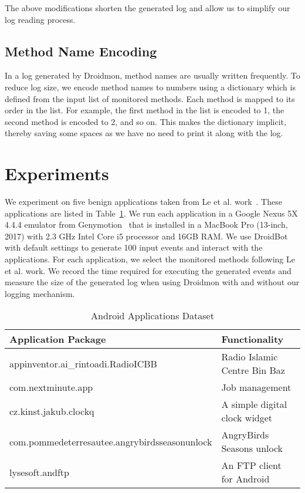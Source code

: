 \documentclass[12pt]{article}
\begin{document}
The above modifications shorten the generated log and allow us to simplify our log reading process. 

\subsection{Method Name Encoding}
In a log generated by Droidmon, method names are usually written frequently. To reduce log size, we encode method names to numbers using a dictionary which is defined from the input list of monitored methods. Each method is mapped to its order in the list. For example, the first method in the list is encoded to 1, the second method is encoded to 2, and so on. This makes the dictionary implicit, thereby saving some spaces as we have no need to print it along with the log.

\section{Experiments}
We experiment on five benign applications taken from Le et al. work~\cite{le2018sandbox}. These applications are listed in Table~\ref{tab:dataset}. We run each application in a Google Nexus 5X 4.4.4 emulator from Genymotion~\cite{genymotion} that is installed in a MacBook Pro (13-inch, 2017) with 2.3 GHz Intel Core i5 processor and 16GB RAM. We use DroidBot~\cite{li2017droidbot} with default settings to generate 100 input events and interact with the applications. For each application, we select the monitored methods following Le et al. work. We record the time required for executing the generated events and measure the size of the generated log when using Droidmon with and without our logging mechanism. 

\begin {table}[t]
\captionsetup{justification=centering,margin=0cm}
\caption {Android Applications Dataset}\label{tab:dataset}
\begin{center}
	\footnotesize
	\begin{tabular}{ll} 
		{\bf Application Package} & {\bf Functionality}\\ 
		\hline
		appinventor.ai\_rintoadi.RadioICBB & Radio Islamic Centre Bin Baz\\
		com.nextminute.app &  Job management\\
		cz.kinst.jakub.clockq & A simple digital clock widget \\
		com.pommedeterresautee.angrybirdsseasonunlock & AngryBirds Seasons unlock  \\
		lysesoft.andftp & An FTP client for Android \\
		\hline
	\end{tabular}
\end{center}
\end{table}
\end{document}
